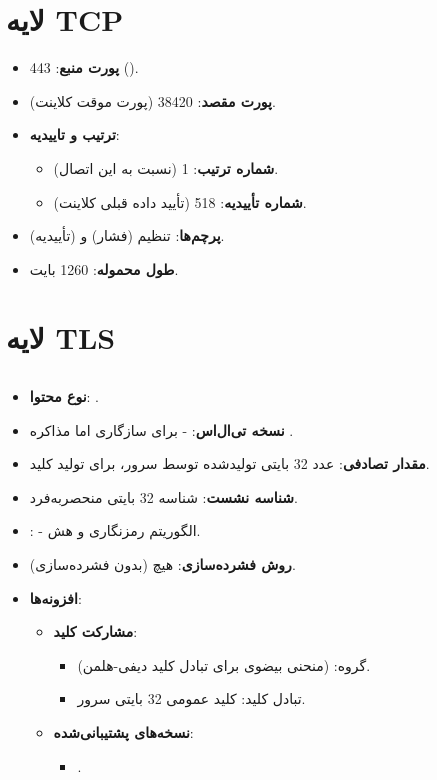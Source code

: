 \section*{لایه TCP}
\begin{itemize}
    \item \textbf{پورت منبع}: 443 ().
    \item \textbf{پورت مقصد}: 38420 (پورت موقت کلاینت).
    \item \textbf{ترتیب و تاییدیه}:
    \begin{itemize}
        \item \textbf{شماره ترتیب}: 1 (نسبت به این اتصال).
        \item \textbf{شماره تأییدیه}: 518 (تأیید داده قبلی کلاینت).
    \end{itemize}
    \item \textbf{پرچم‌ها}: تنظیم  (فشار) و  (تأییدیه).
    \item \textbf{طول محموله}: 1260 بایت.
\end{itemize}

\section*{لایه TLS}
\subsection*{}
\begin{itemize}
    \item \textbf{نوع محتوا}: .
    \item \textbf{نسخه تی‌ال‌اس}:  - برای سازگاری اما مذاکره .
    \item \textbf{مقدار تصادفی}: عدد 32 بایتی تولیدشده توسط سرور، برای تولید کلید.
    \item \textbf{شناسه نشست}: شناسه 32 بایتی منحصربه‌فرد.
    \item \textbf{}:  - الگوریتم رمزنگاری و هش.
    \item \textbf{روش فشرده‌سازی}: هیچ (بدون فشرده‌سازی).
    \item \textbf{افزونه‌ها}:
    \begin{itemize}
        \item \textbf{مشارکت کلید}:
        \begin{itemize}
            \item گروه:  (منحنی بیضوی برای تبادل کلید دیفی-هلمن).
            \item تبادل کلید: کلید عمومی 32 بایتی سرور.
        \end{itemize}
        \item \textbf{نسخه‌های پشتیبانی‌شده}:
        \begin{itemize}
            \item {}.
        \end{itemize}
    \end{itemize}
\end{itemize}

